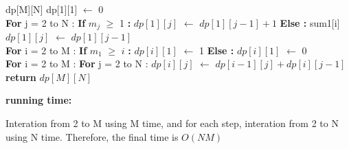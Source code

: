 \documentclass[12pt]{article}
\begin{document}
\begin{algorithm}
\begin{algorithmic}
\State dp[M][N]
\State dp[1][1] $\leftarrow$ 0
\\
\State \textbf{For} j = 2 to N :
\State \hspace{0.4cm} \textbf{If} $m_j$ $\geq$ 1 \textbf{:}
\State \hspace{0.8cm} $dp[1][j]$ $\leftarrow$ $dp[1][j - 1] + 1$
\State \hspace{0.4cm} \textbf{Else :}
\State \hspace{0.8cm} sum1[i] $dp[1][j]$ $\leftarrow$ $dp[1][j - 1]$
\\
\State \textbf{For} i = 2 to M :
\State \hspace{0.4cm} \textbf{If} $m_1$ $\geq$ $i$ \textbf{:}
\State \hspace{0.8cm} $dp[i][1]$ $\leftarrow$ 1
\State \hspace{0.4cm} \textbf{Else :}
\State \hspace{0.8cm} $dp[i][1]$ $\leftarrow$ 0
\\
\State \textbf{For} i = 2 to M :
\State \hspace{0.4cm} \textbf{For} j = 2 to N :
\State \hspace{0.8cm} $dp[i][j]$ $\leftarrow$ $dp[i - 1][j] + dp[i][j - 1]$
\\
\State \textbf{return} $dp[M][N]$
\end{algorithmic}
\end{algorithm}


\textbf{running time:} \par
Interation from 2 to M using M time, and for each step, interation from 2 to N using N time.
Therefore, the final time is $O(N M)$
\end{document}
